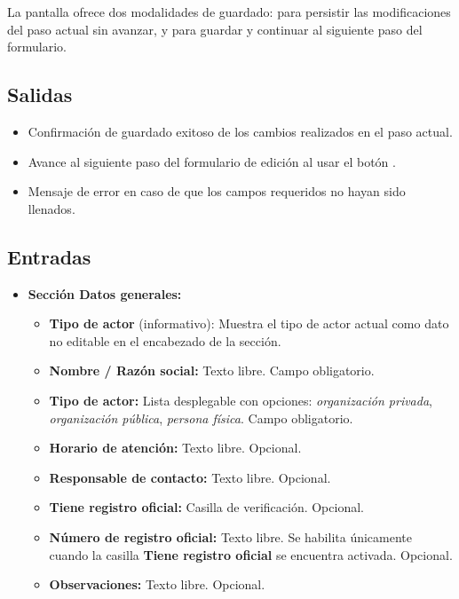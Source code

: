 La pantalla ofrece dos modalidades de guardado:  
para persistir las modificaciones del paso actual sin avanzar, y 
 para guardar y continuar al siguiente paso del formulario.


\subsection{Salidas}
\begin{itemize}
	\item Confirmación de guardado exitoso de los cambios realizados en el paso 
	actual.
	\item Avance al siguiente paso del formulario de edición al usar el botón 
	.
	\item Mensaje de error  en 
	caso de que los campos requeridos no hayan sido llenados.
\end{itemize}

\subsection{Entradas}
\begin{itemize}
	\item \textbf{Sección Datos generales:}
	\begin{itemize}
		\item \textbf{Tipo de actor} (informativo): Muestra el tipo de actor 
		actual como dato no editable en el encabezado de la sección.
		\item \textbf{Nombre / Razón social:} Texto libre. Campo obligatorio.
		\item \textbf{Tipo de actor:} Lista desplegable con opciones: 
		\textit{organización privada}, \textit{organización pública}, 
		\textit{persona física}. Campo obligatorio.
		\item \textbf{Horario de atención:} Texto libre. Opcional.
		\item \textbf{Responsable de contacto:} Texto libre. Opcional.
		\item \textbf{Tiene registro oficial:} Casilla de verificación. 
		Opcional.
		\item \textbf{Número de registro oficial:} Texto libre. Se habilita 
		únicamente cuando la casilla \textbf{Tiene registro oficial} se 
		encuentra activada. Opcional.
		\item \textbf{Observaciones:} Texto libre. Opcional.
	\end{itemize}
\end{itemize}

